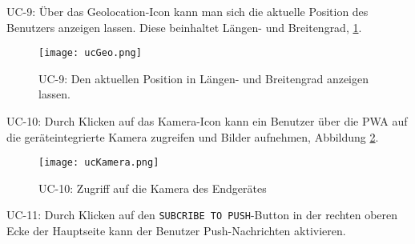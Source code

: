 UC-9:
Über das Geolocation-Icon kann man sich die aktuelle Position des Benutzers anzeigen lassen. Diese beinhaltet Längen- und Breitengrad, \ref{uc9}.\\
\begin{figure}[!htb]
    \centering
    \texttt{[image: ucGeo.png]}
    \caption{UC-9: Den aktuellen Position in Längen- und Breitengrad anzeigen lassen.  }
    \label{uc9}
\end{figure}

\newpage

UC-10:
Durch Klicken auf das Kamera-Icon kann ein Benutzer über die PWA auf die geräteintegrierte Kamera zugreifen und Bilder aufnehmen, Abbildung \ref{uc10}.\\

\begin{figure}[!htb]
    \centering
    \texttt{[image: ucKamera.png]}
    \caption{UC-10: Zugriff auf die Kamera des Endgerätes}
    \label{uc10}
\end{figure}


UC-11:
Durch Klicken auf den \texttt{SUBCRIBE TO PUSH}-Button in der rechten oberen Ecke der Hauptseite kann der Benutzer Push-Nachrichten aktivieren.


